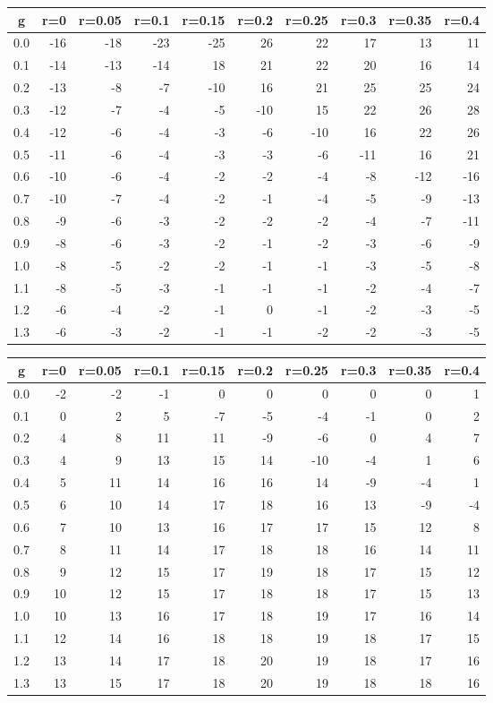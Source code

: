 %
\begin{table}[!tbp]
 \begin{center}
 \begin{tabular}{rrrrrrrrrr}\hline\hline
\multicolumn{1}{c}{g}&\multicolumn{1}{c}{r=0}&\multicolumn{1}{c}{r=0.05}&\multicolumn{1}{c}{r=0.1}&\multicolumn{1}{c}{r=0.15}&\multicolumn{1}{c}{r=0.2}&\multicolumn{1}{c}{r=0.25}&\multicolumn{1}{c}{r=0.3}&\multicolumn{1}{c}{r=0.35}&\multicolumn{1}{c}{r=0.4}\tabularnewline
\hline
0.0&-16&-18&-23&-25& 26& 22& 17& 13& 11\tabularnewline
0.1&-14&-13&-14& 18& 21& 22& 20& 16& 14\tabularnewline
0.2&-13& -8& -7&-10& 16& 21& 25& 25& 24\tabularnewline
0.3&-12& -7& -4& -5&-10& 15& 22& 26& 28\tabularnewline
0.4&-12& -6& -4& -3& -6&-10& 16& 22& 26\tabularnewline
0.5&-11& -6& -4& -3& -3& -6&-11& 16& 21\tabularnewline
0.6&-10& -6& -4& -2& -2& -4& -8&-12&-16\tabularnewline
0.7&-10& -7& -4& -2& -1& -4& -5& -9&-13\tabularnewline
0.8& -9& -6& -3& -2& -2& -2& -4& -7&-11\tabularnewline
0.9& -8& -6& -3& -2& -1& -2& -3& -6& -9\tabularnewline
1.0& -8& -5& -2& -2& -1& -1& -3& -5& -8\tabularnewline
1.1& -8& -5& -3& -1& -1& -1& -2& -4& -7\tabularnewline
1.2& -6& -4& -2& -1&  0& -1& -2& -3& -5\tabularnewline
1.3& -6& -3& -2& -1& -1& -2& -2& -3& -5\tabularnewline
\hline
\end{tabular}

\end{center}

\end{table}

%
\begin{table}[!tbp]
 \begin{center}
 \begin{tabular}{rrrrrrrrrr}\hline\hline
\multicolumn{1}{c}{g}&\multicolumn{1}{c}{r=0}&\multicolumn{1}{c}{r=0.05}&\multicolumn{1}{c}{r=0.1}&\multicolumn{1}{c}{r=0.15}&\multicolumn{1}{c}{r=0.2}&\multicolumn{1}{c}{r=0.25}&\multicolumn{1}{c}{r=0.3}&\multicolumn{1}{c}{r=0.35}&\multicolumn{1}{c}{r=0.4}\tabularnewline
\hline
0.0&-2&-2&-1& 0& 0&  0& 0& 0& 1\tabularnewline
0.1& 0& 2& 5&-7&-5& -4&-1& 0& 2\tabularnewline
0.2& 4& 8&11&11&-9& -6& 0& 4& 7\tabularnewline
0.3& 4& 9&13&15&14&-10&-4& 1& 6\tabularnewline
0.4& 5&11&14&16&16& 14&-9&-4& 1\tabularnewline
0.5& 6&10&14&17&18& 16&13&-9&-4\tabularnewline
0.6& 7&10&13&16&17& 17&15&12& 8\tabularnewline
0.7& 8&11&14&17&18& 18&16&14&11\tabularnewline
0.8& 9&12&15&17&19& 18&17&15&12\tabularnewline
0.9&10&12&15&17&18& 18&17&15&13\tabularnewline
1.0&10&13&16&17&18& 19&17&16&14\tabularnewline
1.1&12&14&16&18&18& 19&18&17&15\tabularnewline
1.2&13&14&17&18&20& 19&18&17&16\tabularnewline
1.3&13&15&17&18&20& 19&18&18&16\tabularnewline
\hline
\end{tabular}

\end{center}

\end{table}

